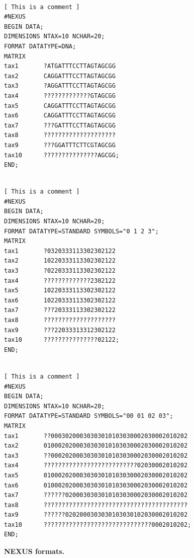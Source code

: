 \documentclass[a4paper,12pt]{article}
\begin{document}
\begin{figure}
\begin{small}
\begin{Verbatim}[frame=single, label=Nexus nucleotides, samepage=true, baselinestretch=0.5]

[ This is a comment ]
#NEXUS
BEGIN DATA;
DIMENSIONS NTAX=10 NCHAR=20;
FORMAT DATATYPE=DNA;
MATRIX
tax1       ?ATGATTTCCTTAGTAGCGG
tax2       CAGGATTTCCTTAGTAGCGG
tax3       ?AGGATTTCCTTAGTAGCGG
tax4       ?????????????GTAGCGG
tax5       CAGGATTTCCTTAGTAGCGG
tax6       CAGGATTTCCTTAGTAGCGG
tax7       ???GATTTCCTTAGTAGCGG
tax8       ????????????????????
tax9       ???GGATTTCTTCGTAGCGG
tax10      ???????????????AGCGG;
END;

\end{Verbatim}
\end{small}

\begin{small}
\begin{Verbatim}[frame=single, label=Nexus digits, samepage=true, baselinestretch=0.5]

[ This is a comment ]
#NEXUS
BEGIN DATA;
DIMENSIONS NTAX=10 NCHAR=20;
FORMAT DATATYPE=STANDARD SYMBOLS="0 1 2 3";
MATRIX
tax1       ?0320333113302302122
tax2       10220333113302302122
tax3       ?0220333113302302122
tax4       ?????????????2302122
tax5       10220333113302302122
tax6       10220333113302302122
tax7       ???20333113302302122
tax8       ????????????????????
tax9       ???22033313312302122
tax10      ???????????????02122;
END;

\end{Verbatim}
\end{small}

\begin{small}
\begin{Verbatim}[frame=single, label=Nexus digits, samepage=true, baselinestretch=0.5]

[ This is a comment ]
#NEXUS
BEGIN DATA;
DIMENSIONS NTAX=10 NCHAR=20;
FORMAT DATATYPE=STANDARD SYMBOLS="00 01 02 03";
MATRIX
tax1       ??00030200030303010103030002030002010202
tax2       0100020200030303010103030002030002010202
tax3       ??00020200030303010103030002030002010202
tax4       ??????????????????????????02030002010202
tax5       0100020200030303010103030002030002010202
tax6       0100020200030303010103030002030002010202
tax7       ??????0200030303010103030002030002010202
tax8       ????????????????????????????????????????
tax9       ??????0202000303030103030102030002010202
tax10      ??????????????????????????????0002010202;
END;

\end{Verbatim}
\end{small}
\caption{\bf NEXUS formats.}\label{fig:nexus}
\end{figure}
\end{document}
